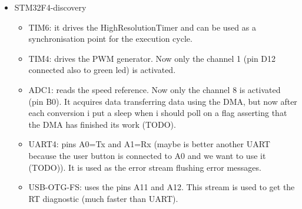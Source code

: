 \begin{itemize}
\item STM32F4-discovery
  \begin{itemize}
  \item TIM6: it drives the HighResolutionTimer and can be used as a synchronisation point for the execution cycle.
  \item TIM4: drives the PWM generator. Now only the channel 1 (pin D12 connected also to green led) is activated.
  \item ADC1: reads the speed reference. Now only the channel 8 is activated (pin B0). It acquires data transferring data using the DMA,
    but now after each conversion i put a sleep when i should poll on a flag asserting that the DMA has finished its work (TODO).
  \item UART4: pins A0=Tx and A1=Rx (maybe is better another UART because the user button is connected to A0 and we want to use it (TODO)).
    It is used as the error stream flushing error messages.
  \item USB-OTG-FS: uses the pins A11 and A12. This stream is used to get the RT diagnostic (much faster than UART).
  \end{itemize}
 \end{itemize}
